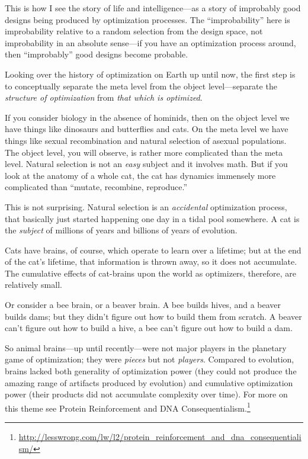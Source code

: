 {
 This is how I see the story of life and intelligence---as a story
of improbably good designs being produced by optimization processes.
The ``improbability'' here is
improbability relative to a random selection from the design space, not
improbability in an absolute sense---if you have an optimization
process around, then ``improbably''
good designs become probable.}

{
 Looking over the history of optimization on Earth up until now,
the first step is to conceptually separate the meta level from the
object level---separate the \textit{structure of optimization} from
\textit{that which is optimized}.}

{
 If you consider biology in the absence of hominids, then on the
object level we have things like dinosaurs and butterflies and cats. On
the meta level we have things like sexual recombination and natural
selection of asexual populations. The object level, you will observe,
is rather more complicated than the meta level. Natural selection is
not an \textit{easy} subject and it involves math. But if you look at
the anatomy of a whole cat, the cat has dynamics immensely more
complicated than ``mutate, recombine,
reproduce.''}

{
 This is not surprising. Natural selection is an
\textit{accidental} optimization process, that basically just started
happening one day in a tidal pool somewhere. A cat is the
\textit{subject} of millions of years and billions of years of
evolution.}

{
 Cats have brains, of course, which operate to learn over a
lifetime; but at the end of the cat's lifetime, that
information is thrown away, so it does not accumulate. The cumulative
effects of cat-brains upon the world as optimizers, therefore, are
relatively small.}

{
 Or consider a bee brain, or a beaver brain. A bee builds hives,
and a beaver builds dams; but they didn't figure out
how to build them from scratch. A beaver can't figure
out how to build a hive, a bee can't figure out how to
build a dam.}

{
 So animal brains---up until recently---were not major players in
the planetary game of optimization; they were \textit{pieces} but not
\textit{players}. Compared to evolution, brains lacked both generality
of optimization power (they could not produce the amazing range of
artifacts produced by evolution) and cumulative optimization power
(their products did not accumulate complexity over time). For more on
this theme see Protein Reinforcement and DNA Consequentialism.\footnote{\url{http://lesswrong.com/lw/l2/protein_reinforcement_and_dna_consequentialism/}}}

